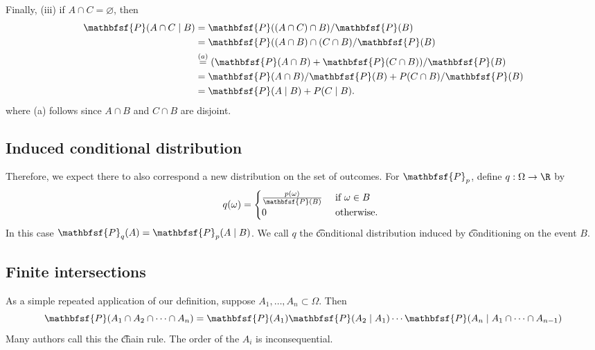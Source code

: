 Finally, (iii) if $A \cap  C = \varnothing$, then
\[
\begin{aligned}
\mathbfsf{P} (A \cap  C \mid  B)
&=
\mathbfsf{P} ((A \cap  C) \cap  B)/\mathbfsf{P} (B) \\
&=
\mathbfsf{P} ((A \cap  B) \cap  (C \cap  B)/\mathbfsf{P} (B) \\
&\overset{(a)}{=}
(\mathbfsf{P} (A \cap  B) + \mathbfsf{P} (C \cap B))/\mathbfsf{P} (B) \\
&=
\mathbfsf{P} (A \cap  B)/\mathbfsf{P} (B) + P(C \cap B)/\mathbfsf{P} (B) \\
&=
\mathbfsf{P} (A \mid  B) + P(C \mid  B).
\end{aligned}
\]
where (a) follows since $A \cap  B$ and $C \cap  B$ are disjoint.

\subsection*{Induced conditional distribution}

Therefore, we expect there to also correspond a new distribution on the set of outcomes.
For $\mathbfsf{P} _p$, define $q: \Omega  \to \R $ by
\[
q(\omega ) = \begin{cases}
\frac{p(\omega )}{\mathbfsf{P} (B)} & \text{ if } \omega  \in B \\
0 & \text{ otherwise. } \\
\end{cases}
\]
In this case $\mathbfsf{P} _q(A) = \mathbfsf{P} _p(A \mid  B)$.
We call $q$ the \t{conditional distribution} induced by \t{conditioning on} the event $B$.

\subsection*{Finite intersections}

As a simple repeated application of our definition, suppose $A_1, \dots , A_n \subset \Omega $.
Then
\[
\mathbfsf{P} (A_1 \cap  A_2 \cap  \cdots \cap  A_n) = \mathbfsf{P} (A_1) \mathbfsf{P} (A_2 \mid  A_1) \cdots \mathbfsf{P} (A_n \mid  A_1 \cap  \cdots \cap  A_{n-1})
\]
Many authors call this the \t{chain rule}. The order of the $A_i$ is inconsequential.
